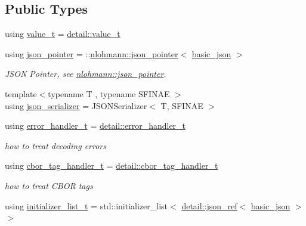 \subsection*{Public Types}
\begin{DoxyCompactItemize}
\item 
using \hyperlink{classnlohmann_1_1basic__json_ac68cb65a7f3517f0c5b1d3a4967406ad}{value\+\_\+t} = \hyperlink{namespacenlohmann_1_1detail_a1ed8fc6239da25abcaf681d30ace4985}{detail\+::value\+\_\+t}
\item 
using \hyperlink{classnlohmann_1_1basic__json_aa8f1f93b32da01b42413643be32b2c27}{json\+\_\+pointer} = \+::\hyperlink{classnlohmann_1_1json__pointer}{nlohmann\+::json\+\_\+pointer}$<$ \hyperlink{classnlohmann_1_1basic__json}{basic\+\_\+json} $>$
\begin{DoxyCompactList}\small\item\em J\+S\+ON Pointer, see \hyperlink{classnlohmann_1_1json__pointer}{nlohmann\+::json\+\_\+pointer}. \end{DoxyCompactList}\item 
{\footnotesize template$<$typename T , typename S\+F\+I\+N\+AE $>$ }\\using \hyperlink{classnlohmann_1_1basic__json_ad6ebc5da7ced975bb184133750e7d49f}{json\+\_\+serializer} = J\+S\+O\+N\+Serializer$<$ T, S\+F\+I\+N\+AE $>$
\item 
using \hyperlink{classnlohmann_1_1basic__json_a1e7ca76cc3f62626b380be5e18a002d5}{error\+\_\+handler\+\_\+t} = \hyperlink{namespacenlohmann_1_1detail_a5a76b60b26dc8c47256a996d18d967df}{detail\+::error\+\_\+handler\+\_\+t}
\begin{DoxyCompactList}\small\item\em how to treat decoding errors \end{DoxyCompactList}\item 
using \hyperlink{classnlohmann_1_1basic__json_a54951d14f0dd10cc3cfdaa24f8bfd15c}{cbor\+\_\+tag\+\_\+handler\+\_\+t} = \hyperlink{namespacenlohmann_1_1detail_a58bb1ef1a9ad287a9cfaf1855784d9ac}{detail\+::cbor\+\_\+tag\+\_\+handler\+\_\+t}
\begin{DoxyCompactList}\small\item\em how to treat C\+B\+OR tags \end{DoxyCompactList}\item 
using \hyperlink{classnlohmann_1_1basic__json_a4d392f594e4c32345d47c2a175aad5c8}{initializer\+\_\+list\+\_\+t} = std\+::initializer\+\_\+list$<$ \hyperlink{classnlohmann_1_1detail_1_1json__ref}{detail\+::json\+\_\+ref}$<$ \hyperlink{classnlohmann_1_1basic__json}{basic\+\_\+json} $>$$>$
$$
\end{DoxyCompactItemize}
